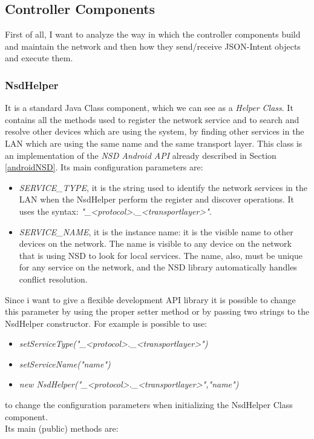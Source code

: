 \subsection{Controller Components}
First of all, I want to analyze the way in which the controller components build and maintain the network and then how they send/receive JSON-Intent objects and execute them.\\
\subsubsection{NsdHelper}
It is a standard Java Class component, which we can see as a \textit{Helper Class}. It contains all the methods used to register the network service and to search and resolve other devices which are using the system, by finding other services in the LAN which are using the same name and the same transport layer. This class is an implementation of the \textit{NSD Android API} already described in Section \ref{androidNSD}.
Its main configuration parameters are:
\begin{itemize}
	\item \textit{SERVICE\_TYPE}, it is the string used to identify the network services in the LAN when the NsdHelper perform the register and discover operations. It uses the syntax: \textit{"\_<protocol>.\_<transportlayer>"}. 
	\item \textit{SERVICE\_NAME}, it is the instance name: it is the visible name to other devices on the network. The name is visible to any device on the network that is using NSD to look for local services. The name, also, must be unique for any service on the network, and the NSD library automatically handles conflict resolution.
\end{itemize}
 Since i want to give a flexible development API library it is possible to change this parameter by using the proper setter method or by passing two strings to the NsdHelper constructor. For example is possible to use:
 \begin{itemize}
 	\item \textit{setServiceType("\_<protocol>.\_<transportlayer>")}
 	\item \textit{setServiceName("name")}
 	\item \textit{new NsdHelper("\_<protocol>.\_<transportlayer>","name")} 
 \end{itemize} to change the configuration parameters when initializing the NsdHelper Class component.\\
Its main (public) methods are:

